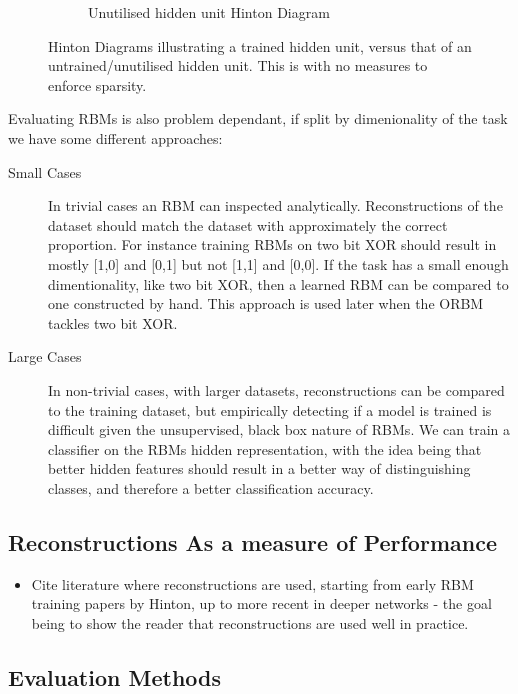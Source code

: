 \begin{figure}[h]
\begin{subfigure}[t]{0.3\textwidth}
      \caption{Unutilised hidden unit Hinton Diagram}
      \label{F:Hinton-Bad}
  \end{subfigure}
  \caption{Hinton Diagrams illustrating a trained hidden unit, versus that of an untrained/unutilised hidden unit. This is with no measures to enforce sparsity.}\label{fig:mnist-worse-best-results}
\end{figure}

  Evaluating RBMs is also problem dependant, if split by dimenionality of the task we have some different approaches:
  \begin{description}
  \item[Small Cases] In trivial cases an RBM can inspected analytically. Reconstructions of the dataset should match the dataset with approximately the correct proportion. For instance training RBMs on two bit XOR should result in mostly [1,0] and [0,1] but not [1,1] and [0,0].
  If the task has a small enough dimentionality, like two bit XOR, then a learned RBM can be compared to one constructed by hand. This approach is used later when the ORBM tackles two bit XOR.

  \item[Large Cases] In non-trivial cases, with larger datasets, reconstructions can be compared to the training dataset,  but empirically detecting if a model is trained is difficult given the unsupervised, black box nature of RBMs.
  We can train a classifier on the RBMs hidden representation, with the idea being that better hidden features should result in a better way of distinguishing classes, and therefore a better classification accuracy.

\end{description}

\subsection{Reconstructions As a measure of Performance}

\begin{itemize}
  \item Cite literature where reconstructions are used, starting from early RBM training papers by Hinton, up to more recent in deeper networks - the goal being to show the reader that reconstructions are used well in practice.
\end{itemize}


\subsection{Evaluation Methods}

